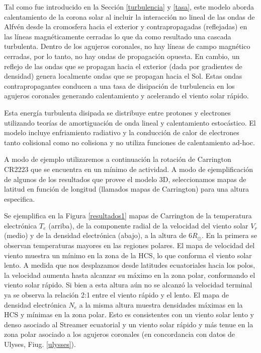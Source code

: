 \documentclass[a4paper,11pt]{report}
\begin{document}
Tal como fue introducido en la Sección \ref{turbulencia} y \ref{tasa}, este modelo aborda calentamiento de la corona solar al incluir la interacción no lineal de las ondas de Alfvén desde la cromosfera hacia el exterior y contrapropagadas (reflejadas) en las líneas magnéticamente cerradas lo que da como resultado una cascada turbulenta. Dentro de los agujeros coronales, no hay líneas de campo magnético cerradas, por lo tanto, no hay ondas de propagación opuesta. En cambio, un reflejo de las ondas que se propagan hacia el exterior (dada por gradientes de densidad) genera localmente ondas que se propagan hacia el Sol. Estas ondas contrapropagantes conducen a una tasa de disipación de turbulencia en los agujeros coronales generando calentamiento y acelerando el viento solar rápido.

Esta energía turbulenta disipada se distribuye entre protones y electrones utilizando teorías de amortiguación de onda lineal y calentamiento estocástico. El modelo incluye enfriamiento radiativo y la conducción de calor de electrones tanto colisional como no colisiona y no utiliza funciones de calentamiento ad-hoc.

A modo de ejemplo utilizaremos a continuación la rotación de Carrington CR2223 que se encuentra en un mínimo de actividad. A modo de ejemplificación de algunos de los resultados que provee el modelo 3D, seleccionamos mapas de latitud en función de longitud (llamados mapas de Carrington) para una altura especifica. 

Se ejemplifica en la Figura \ref{resultados1} mapas de Carrington de la temperatura electrónica $T_e$ (arriba), de la componente radial de la velocidad del viento solar $V_r$ (medio) y de la densidad electrónica (abajo), a la altura de $6 R_{\odot}$. En la primera se observan temperaturas mayores en las regiones polares. El mapa de velocidad del viento muestra un mínimo en la zona de la HCS, lo que conforma el viento solar lento. A medida que nos desplazamos desde latitudes ecuatoriales hacia los polos, la velocidad aumenta hasta alcanzar su máximo en la zona polar, conformando el viento solar rápido. Si bien a esta altura aún no se alcanzó la velocidad terminal ya se observa la relación 2:1 entre el viento rápido y el lento. El mapa de densidad electrónica $N_e$ a la misma altura muestra densidades máximas en la HCS y mínimas en la zona polar. Esto es consistentes con un viento solar lento y denso asociado al Streamer ecuatorial y un viento solar rápido y más tenue en la zona polar asociado a los agujeros coronales (en concordancia con datos de Ulyses, Fiug. \ref{ulysses}).
\end{document}
